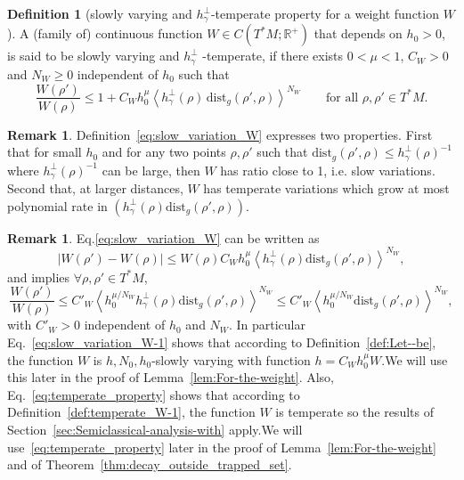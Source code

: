 \documentclass[10pt]{amsart}
\theoremstyle{definition}\newtheorem{defi}[theo]{Definition}\newtheorem{rema}[theo]{Remark}\newtheorem{exam}[theo]{Example}\newtheorem{exem}[theo]{Example}\newtheorem{nota}[theo]{Notation}
\newcommand{\dist}{\mathrm{dist}}
\newcommand{\bbR}{\mathbb{R}}
\let\oldforall\forall
\renewcommand*{\forall}{\mathrel{\oldforall}}
\begin{document}
\begin{cBoxA}{}
\begin{defi}[slowly varying and $h_{\gamma}^{\perp}$-temperate property for a
weight function $W$]\label{def:temperate_W}
A (family of) continuous function $W\in C(T^{*}M;\bbR^{+})$ that depends on $h_{0}>0$, is said to be slowly varying and $h_{\gamma}^{\perp}$ -temperate, if there exists $0<\mu<1$, $C_{W}>0$ and $N_{W}\geq0$ independent of $h_{0}$ such that
\begin{equation}\label{eq:slow_variation_W}
\frac{W\left(\rho'\right)}{W\left(\rho\right)}\leq1+C_{W}h_{0}^{\mu}\left\langle h_{\gamma}^{\perp}\left(\rho\right)\,\dist_{g}\left(\rho',\rho\right)\right\rangle ^{N_{W}}\qquad\text{for all }\rho,\rho'\in T^{*}M.
\end{equation}
\end{defi}
\end{cBoxA}

\begin{rema}
Definition~\eqref{eq:slow_variation_W} expresses two properties. First that for small $h_{0}$ and for any two points $\rho,\rho'$ such that $\dist_{g}(\rho',\rho)\leq h_{\gamma}^{\perp}(\rho)^{-1}$ where $h_{\gamma}^{\perp}(\rho)^{-1}$ can be large, then $W$ has ratio close to 1, i.e. slow variations. Second that, at larger distances, $W$ has temperate variations which grow at most polynomial rate in $(h_{\gamma}^{\perp}(\rho)\dist_{g}(\rho',\rho))$.
\end{rema}


\begin{rema}
Eq.\eqref{eq:slow_variation_W} can be written as
\begin{equation}\label{eq:slow_variation_W-1}
\left|W\left(\rho'\right)-W\left(\rho\right)\right|\leq W\left(\rho\right)C_{W}h_{0}^{\mu}\left\langle h_{\gamma}^{\perp}\left(\rho\right)\dist_{g}\left(\rho',\rho\right)\right\rangle ^{N_{W}},
\end{equation}
and implies $\forall\rho,\rho'\in T^{*}M$,
\begin{equation}\label{eq:temperate_property}
\frac{W\left(\rho'\right)}{W\left(\rho\right)}\leq C'_{W}\left\langle h_{0}^{\mu/N_{W}}h_{\gamma}^{\perp}\left(\rho\right)\dist_{g}\left(\rho',\rho\right)\right\rangle ^{N_{W}}\leq C'_{W}\left\langle h_{0}^{\mu/N_{W}}\dist_{g}\left(\rho',\rho\right)\right\rangle ^{N_{W}},
\end{equation}
with $C'_{W}>0$ independent of $h_{0}$ and $N_{W}$. In particular Eq.~\eqref{eq:slow_variation_W-1} shows that according to Definition~\ref{def:Let--be}, the function $W$ is $h,N_0,h_0$-slowly varying with function $h=C_{W}h_{0}^{\mu}W$.\linebreak We will use this later in the proof of Lemma~\ref{lem:For-the-weight}. Also, Eq.~\eqref{eq:temperate_property} shows that according to Definition~\ref{def:temperate_W-1}, the function $W$ is temperate so the results of Section~\ref{sec:Semiclassical-analysis-with} apply.\linebreak We will use~\eqref{eq:temperate_property} later in the proof of Lemma~\ref{lem:For-the-weight} and of Theorem~\ref{thm:decay_outside_trapped_set}.
\end{rema}
\end{document}
